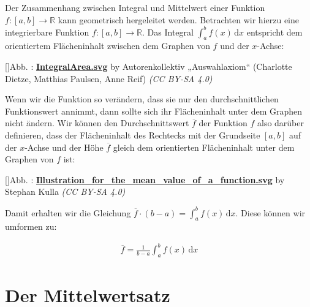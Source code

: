 \documentclass[fontsize=9pt,
               parskip=half-,
               DIV=14,
               listof=chapterentry,
               tocflat]{scrbook}
\newcounter{imagelabel}
\begin{document}
Der Zusammenhang zwischen Integral und Mittelwert einer Funktion $f:[a,b]\to \mathbb {R} $ kann geometrisch hergeleitet werden. Betrachten wir hierzu eine integrierbare Funktion $f:[a,b]\to \mathbb {R} $. Das Integral $\int _{a}^{b}f(x)\,\mathrm {d} x$ entspricht dem orientiertem Flächeninhalt zwischen dem Graphen von $f$ und der $x$-Achse:

[]{Abb. : \protect\href{https://commons.wikimedia.org/wiki/File:IntegralArea.svg}{\textbf{IntegralArea.svg}} by Autorenkollektiv „Auswahlaxiom“ (Charlotte Dietze, Matthias Paulsen, Anne Reif) \textit{(CC BY-SA 4.0)}}\begin{center}
\end{center}

Wenn wir die Funktion so verändern, dass sie nur den durchschnittlichen Funktionswert annimmt, dann sollte sich ihr Flächeninhalt unter dem Graphen nicht ändern. Wir können den Durchschnittswert ${\overline {f}}$ der Funktion $f$ also darüber definieren, dass der Flächeninhalt des Rechtecks mit der Grundseite $[a,b]$ auf der $x$-Achse und der Höhe ${\overline {f}}$ gleich dem orientierten Flächeninhalt unter dem Graphen von $f$ ist:

[]{Abb. : \protect\href{https://commons.wikimedia.org/wiki/File:Illustration_for_the_mean_value_of_a_function.svg}{\textbf{Illustration\allowbreak\_for\allowbreak\_the\allowbreak\_mean\allowbreak\_value\allowbreak\_of\allowbreak\_a\allowbreak\_function.svg}} by Stephan Kulla \textit{(CC BY-SA 4.0)}}\begin{center}
\end{center}

Damit erhalten wir die Gleichung ${\overline {f}}\cdot (b-a)=\int _{a}^{b}f(x)\,\mathrm {d} x$. Diese können wir umformen zu:

\begin{align*}
{\overline {f}}={\frac {1}{b-a}}\int _{a}^{b}f(x)\,\mathrm {d} x
\end{align*}

\section{Der Mittelwertsatz}
\end{document}
